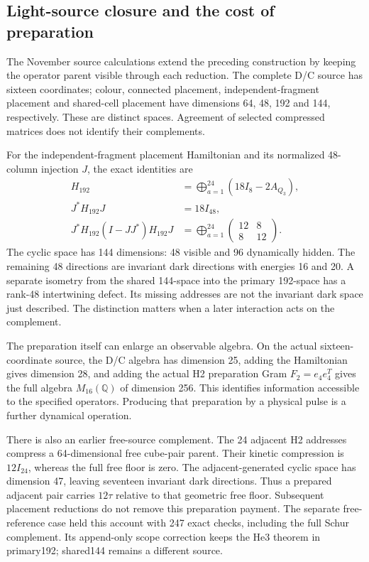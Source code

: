\subsection{Light-source closure and the cost of preparation}
\label{sec:light-closure-new}

The November source calculations extend the preceding construction by keeping
the operator parent visible through each reduction. The complete D/C source
has sixteen coordinates; colour, connected placement, independent-fragment
placement and shared-cell placement have dimensions 64, 48, 192 and 144,
respectively. These are distinct spaces. Agreement of selected compressed
matrices does not identify their complements.

For the independent-fragment placement Hamiltonian and its normalized
48-column injection $J$, the exact identities are
\begin{align}
H_{192}&=\bigoplus_{a=1}^{24}(18I_8-2A_{Q_3}),\\
J^*H_{192}J&=18I_{48},\\
J^*H_{192}(I-JJ^*)H_{192}J
&=\bigoplus_{a=1}^{24}\begin{pmatrix}12&8\\8&12\end{pmatrix}.
\end{align}
The cyclic space has 144 dimensions: 48 visible and 96 dynamically hidden.
The remaining 48 directions are invariant dark directions with energies 16
and 20. A separate isometry from the shared 144-space into the primary
192-space has a rank-48 intertwining defect. Its missing addresses are not
the invariant dark space just described. The distinction matters when a
later interaction acts on the complement.

The preparation itself can enlarge an observable algebra. On the actual
sixteen-coordinate source, the D/C algebra has dimension 25, adding the
Hamiltonian gives dimension 28, and adding the actual H2 preparation Gram
$F_2=e_4e_4^T$ gives the full algebra $M_{16}(\mathbb Q)$ of dimension 256.
This identifies information accessible to the specified operators. Producing
that preparation by a physical pulse is a further dynamical operation.

There is also an earlier free-source complement. The 24 adjacent H2
addresses compress a 64-dimensional free cube-pair parent. Their kinetic
compression is $12I_{24}$, whereas the full free floor is zero. The
adjacent-generated cyclic space has dimension 47, leaving seventeen
invariant dark directions. Thus a prepared adjacent pair carries $12\tau$
relative to that geometric free floor. Subsequent placement reductions do
not remove this preparation payment. The separate free-reference case held
this account with 247 exact checks, including the full Schur complement.
Its append-only scope correction keeps the He3 theorem in primary192;
shared144 remains a different source.

